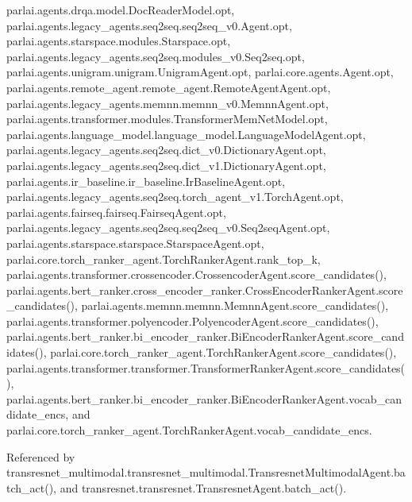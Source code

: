 parlai.\+agents.\+drqa.\+model.\+Doc\+Reader\+Model.\+opt, parlai.\+agents.\+legacy\+\_\+agents.\+seq2seq.\+seq2seq\+\_\+v0.\+Agent.\+opt, parlai.\+agents.\+starspace.\+modules.\+Starspace.\+opt, parlai.\+agents.\+legacy\+\_\+agents.\+seq2seq.\+modules\+\_\+v0.\+Seq2seq.\+opt, parlai.\+agents.\+unigram.\+unigram.\+Unigram\+Agent.\+opt, parlai.\+core.\+agents.\+Agent.\+opt, parlai.\+agents.\+remote\+\_\+agent.\+remote\+\_\+agent.\+Remote\+Agent\+Agent.\+opt, parlai.\+agents.\+legacy\+\_\+agents.\+memnn.\+memnn\+\_\+v0.\+Memnn\+Agent.\+opt, parlai.\+agents.\+transformer.\+modules.\+Transformer\+Mem\+Net\+Model.\+opt, parlai.\+agents.\+language\+\_\+model.\+language\+\_\+model.\+Language\+Model\+Agent.\+opt, parlai.\+agents.\+legacy\+\_\+agents.\+seq2seq.\+dict\+\_\+v0.\+Dictionary\+Agent.\+opt, parlai.\+agents.\+legacy\+\_\+agents.\+seq2seq.\+dict\+\_\+v1.\+Dictionary\+Agent.\+opt, parlai.\+agents.\+ir\+\_\+baseline.\+ir\+\_\+baseline.\+Ir\+Baseline\+Agent.\+opt, parlai.\+agents.\+legacy\+\_\+agents.\+seq2seq.\+torch\+\_\+agent\+\_\+v1.\+Torch\+Agent.\+opt, parlai.\+agents.\+fairseq.\+fairseq.\+Fairseq\+Agent.\+opt, parlai.\+agents.\+legacy\+\_\+agents.\+seq2seq.\+seq2seq\+\_\+v0.\+Seq2seq\+Agent.\+opt, parlai.\+agents.\+starspace.\+starspace.\+Starspace\+Agent.\+opt, parlai.\+core.\+torch\+\_\+ranker\+\_\+agent.\+Torch\+Ranker\+Agent.\+rank\+\_\+top\+\_\+k, parlai.\+agents.\+transformer.\+crossencoder.\+Crossencoder\+Agent.\+score\+\_\+candidates(), parlai.\+agents.\+bert\+\_\+ranker.\+cross\+\_\+encoder\+\_\+ranker.\+Cross\+Encoder\+Ranker\+Agent.\+score\+\_\+candidates(), parlai.\+agents.\+memnn.\+memnn.\+Memnn\+Agent.\+score\+\_\+candidates(), parlai.\+agents.\+transformer.\+polyencoder.\+Polyencoder\+Agent.\+score\+\_\+candidates(), parlai.\+agents.\+bert\+\_\+ranker.\+bi\+\_\+encoder\+\_\+ranker.\+Bi\+Encoder\+Ranker\+Agent.\+score\+\_\+candidates(), parlai.\+core.\+torch\+\_\+ranker\+\_\+agent.\+Torch\+Ranker\+Agent.\+score\+\_\+candidates(), parlai.\+agents.\+transformer.\+transformer.\+Transformer\+Ranker\+Agent.\+score\+\_\+candidates(), parlai.\+agents.\+bert\+\_\+ranker.\+bi\+\_\+encoder\+\_\+ranker.\+Bi\+Encoder\+Ranker\+Agent.\+vocab\+\_\+candidate\+\_\+encs, and parlai.\+core.\+torch\+\_\+ranker\+\_\+agent.\+Torch\+Ranker\+Agent.\+vocab\+\_\+candidate\+\_\+encs.



Referenced by transresnet\+\_\+multimodal.\+transresnet\+\_\+multimodal.\+Transresnet\+Multimodal\+Agent.\+batch\+\_\+act(), and transresnet.\+transresnet.\+Transresnet\+Agent.\+batch\+\_\+act().

